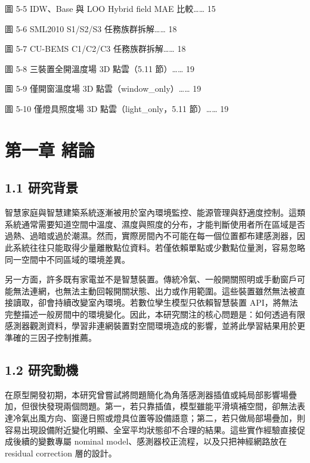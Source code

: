 \documentclass[12pt,a4paper]{article}
\begin{document}
圖 5-5 IDW、Base 與 LOO Hybrid field MAE 比較…… 15


圖 5-6 SML2010 S1/S2/S3 任務族群拆解…… 18


圖 5-7 CU-BEMS C1/C2/C3 任務族群拆解…… 18


圖 5-8 三裝置全開溫度場 3D 點雲（5.11 節）…… 19


圖 5-9 僅開窗溫度場 3D 點雲（window\_\allowbreak{}only）…… 19


圖 5-10 僅燈具照度場 3D 點雲（light\_\allowbreak{}only，5.11 節）…… 19


\clearpage

\clearpage{}

\section*{第一章 緒論}

\subsection*{1.1 研究背景}

智慧家庭與智慧建築系統逐漸被用於室內環境監控、能源管理與舒適度控制。這類系統通常需要知道空間中溫度、濕度與照度的分布，才能判斷使用者所在區域是否過熱、過暗或過於潮濕。然而，實際房間內不可能在每一個位置都布建感測器，因此系統往往只能取得少量離散點位資料。若僅依賴單點或少數點位量測，容易忽略同一空間中不同區域的環境差異。


另一方面，許多既有家電並不是智慧裝置。傳統冷氣、一般開關照明或手動窗戶可能無法連網，也無法主動回報開關狀態、出力或作用範圍。這些裝置雖然無法被直接讀取，卻會持續改變室內環境。若數位孿生模型只依賴智慧裝置 API，將無法完整描述一般房間中的環境變化。因此，本研究關注的核心問題是：如何透過有限感測器觀測資料，學習非連網裝置對空間環境造成的影響，並將此學習結果用於更準確的三因子控制推薦。


\subsection*{1.2 研究動機}

在原型開發初期，本研究曾嘗試將問題簡化為角落感測器插值或純局部影響場疊加，但很快發現兩個問題。第一，若只靠插值，模型雖能平滑填補空間，卻無法表達冷氣出風方向、窗邊日照或燈具位置等設備語意；第二，若只做局部場疊加，則容易出現設備附近變化明顯、全室平均狀態卻不合理的結果。這些實作經驗直接促成後續的變數專屬 nominal model、感測器校正流程，以及只把神經網路放在 residual correction 層的設計。
\end{document}
